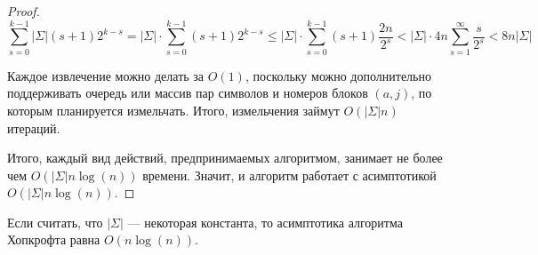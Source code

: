 \documentclass{article}
\begin{document}
\begin{proof}
  \[\sum_{s=0}^{k-1} |\Sigma| (s + 1) 2^{k-s} = |\Sigma| \cdot \sum_{s=0}^{k-1} (s + 1) 2^{k - s} \le |\Sigma| \cdot \sum_{s = 0}^{k - 1} (s + 1) \frac{2n}{2^s} < |\Sigma| \cdot 4n \sum_{s = 1}^{\infty} \frac{s}{2^s} < 8n |\Sigma|\]

  Каждое извлечение можно делать за $O(1)$, поскольку можно дополнительно поддерживать очередь или массив пар символов и номеров блоков $(a, j)$, по которым планируется измельчать. Итого, измельчения займут $O(|\Sigma| n)$ итераций.
  

  Итого, каждый вид действий, предпринимаемых алгоритмом, занимает не более чем $O(|\Sigma|n\log(n))$ времени. Значит, и алгоритм работает с асимптотикой $O(|\Sigma|n\log(n))$.

\end{proof}
Если считать, что $|\Sigma|$ --- некоторая константа, то асимптотика алгоритма Хопкрофта равна $O(n\log(n))$.
\end{document}
